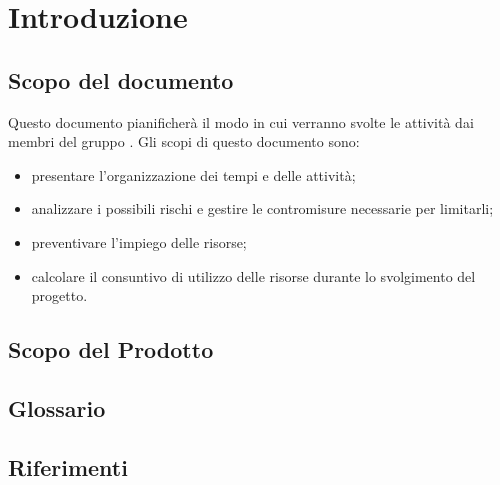 %


\section{Introduzione}
	\subsection{Scopo del documento}
Questo documento pianificherà il modo in cui verranno svolte le attività dai membri del gruppo \groupName.
Gli scopi di questo documento sono:
		\begin{itemize}
			\item presentare l’organizzazione dei tempi e delle attività;
			\item analizzare i possibili rischi e gestire le contromisure necessarie per limitarli;
			\item preventivare l’impiego delle risorse;
			\item calcolare il consuntivo di utilizzo delle risorse durante lo svolgimento del progetto.
		\end{itemize}
		
	\subsection{Scopo del Prodotto}
		\productScope
		
	\subsection{Glossario}
		\glossarioDesc
		
	\subsection{Riferimenti}
